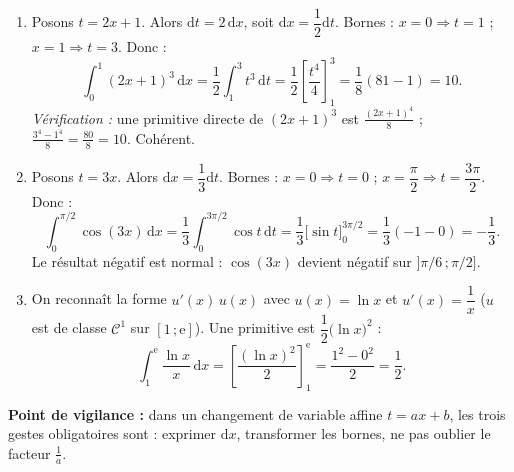\documentclass[11pt]{article}
\begin{document}
\begin{corrige}
\begin{enumerate}
\item Posons $t=2x+1$. Alors $\mathrm{d}t = 2\,\mathrm{d}x$, soit $\mathrm{d}x = \dfrac{1}{2}\mathrm{d}t$. Bornes : $x=0 \Rightarrow t=1$ ; $x=1 \Rightarrow t=3$. Donc :
\[
\int_0^1 (2x+1)^3\,\mathrm{d}x = \dfrac{1}{2}\int_1^3 t^3\,\mathrm{d}t = \dfrac{1}{2}\left[\dfrac{t^4}{4}\right]_1^3 = \dfrac{1}{8}(81-1) = \boxed{10}.
\]
\emph{Vérification :} une primitive directe de $(2x+1)^3$ est $\frac{(2x+1)^4}{8}$ ; $\frac{3^4-1^4}{8} = \frac{80}{8} = 10$. Cohérent.
\item Posons $t=3x$. Alors $\mathrm{d}x = \dfrac{1}{3}\mathrm{d}t$. Bornes : $x=0 \Rightarrow t=0$ ; $x=\dfrac{\pi}{2} \Rightarrow t=\dfrac{3\pi}{2}$. Donc :
\[
\int_0^{\pi/2} \cos(3x)\,\mathrm{d}x = \dfrac{1}{3}\int_0^{3\pi/2} \cos t\,\mathrm{d}t = \dfrac{1}{3}\big[\sin t\big]_0^{3\pi/2} = \dfrac{1}{3}(-1-0) = \boxed{-\dfrac{1}{3}}.
\]
Le résultat négatif est normal : $\cos(3x)$ devient négatif sur $]\pi/6\,;\pi/2]$.
\item On reconnaît la forme $u'(x)\,u(x)$ avec $u(x)=\ln x$ et $u'(x)=\dfrac{1}{x}$ ($u$ est de classe $\mathcal{C}^1$ sur $[1\,;\mathrm{e}]$). Une primitive est $\dfrac{1}{2}\big(\ln x\big)^2$ :
\[
\int_1^{\mathrm{e}} \dfrac{\ln x}{x}\,\mathrm{d}x = \left[\dfrac{(\ln x)^2}{2}\right]_1^{\mathrm{e}} = \dfrac{1^2-0^2}{2} = \boxed{\dfrac{1}{2}}.
\]
\end{enumerate}
\textbf{Point de vigilance :} dans un changement de variable affine $t=ax+b$, les trois gestes obligatoires sont : exprimer $\mathrm{d}x$, transformer les bornes, ne pas oublier le facteur $\frac{1}{a}$.
\end{corrige}
\end{document}

